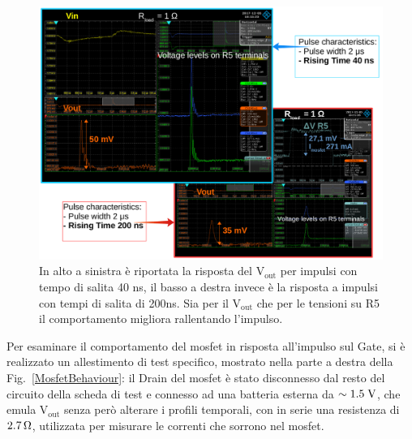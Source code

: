 \begin{figure}
\centering
\includegraphics[width=\linewidth]{Immagini/RiseTime}
\caption{In alto a sinistra è riportata la risposta del $\mathrm{V_{out}}$ per impulsi con tempo di salita 40 ns, il basso a destra invece è la risposta a impulsi con tempi di salita di 200ns. Sia per il $\mathrm{V_{out}}$ che per le tensioni su R5 il comportamento migliora rallentando l'impulso.}
\label{RiseTime}
\end{figure}

Per esaminare il comportamento del mosfet in risposta all'impulso sul Gate, si è realizzato un allestimento di test specifico, mostrato nella parte a destra della Fig.~\ref{MosfetBehaviour}: il Drain del mosfet è stato disconnesso dal resto del circuito della scheda di test e connesso ad una batteria esterna da $\sim 1.5\rm \; V$, che emula $\mathrm{V_{out}}$ senza per\`o alterare i profili temporali, con in serie una resistenza di $2.7{\rm \, \Omega}$, utilizzata per misurare le correnti che sorrono nel mosfet. 

